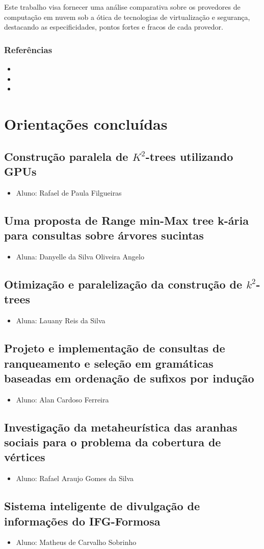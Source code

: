 \documentclass{article}
\newcommand*{\nsubsection}[1]{
    \subsection{#1}
}
\begin{document}
Este trabalho visa fornecer uma análise comparativa sobre os provedores de computação em nuvem sob a ótica de tecnologias de virtualização e segurança, destacando as especificidades, pontos fortes e fracos de cada provedor.




\subsubsection*{Referências}
\begin{itemize}
	\item {}	
	\item {}
	\item {}
\end{itemize}

\newpage
\section{Orientações concluídas}

\nsubsection{Construção paralela de $K^2$-trees utilizando GPUs}

\begin{itemize}
	\item Aluno: Rafael de Paula Filgueiras
\end{itemize}


\nsubsection{Uma proposta de Range min-Max tree k-ária para consultas sobre
árvores sucintas}

\begin{itemize}
	\item Aluna: Danyelle da Silva Oliveira Angelo
\end{itemize}

\nsubsection{Otimização e paralelização da construção de $k^2$-trees}

\begin{itemize}
	\item Aluna: Lauany Reis da Silva
\end{itemize}

\nsubsection{Projeto e implementação de consultas de ranqueamento e seleção em gramáticas baseadas em ordenação de sufixos por indução}

\begin{itemize}
	\item Aluno: Alan Cardoso Ferreira
\end{itemize}

\nsubsection{Investigação da metaheurística das aranhas sociais para o problema da cobertura de vértices}

\begin{itemize}
	\item Aluno: Rafael Araujo Gomes da Silva
\end{itemize}

\nsubsection{Sistema inteligente de divulgação de informações do IFG-Formosa}

\begin{itemize}
	\item Aluno: Matheus de Carvalho Sobrinho
\end{itemize}
\end{document}
